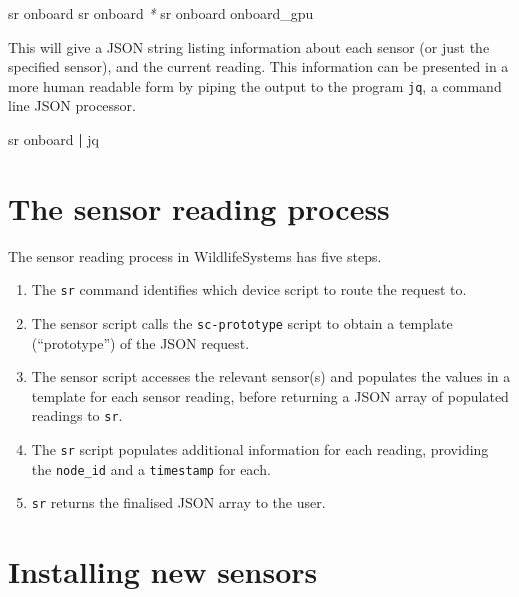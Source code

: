 \documentclass[
]{book}
\newenvironment{Shaded}{\begin{snugshade}}{\end{snugshade}}
\newcommand{\ExtensionTok}[1]{#1}
\newcommand{\KeywordTok}[1]{\textcolor[rgb]{0.13,0.29,0.53}{\textbf{#1}}}
\newcommand{\NormalTok}[1]{#1}
\newcommand{\PreprocessorTok}[1]{\textcolor[rgb]{0.56,0.35,0.01}{\textit{#1}}}
\begin{document}
\begin{Shaded}
\begin{Highlighting}[]
\ExtensionTok{sr}\NormalTok{ onboard}
\ExtensionTok{sr}\NormalTok{ onboard }\PreprocessorTok{*}
\ExtensionTok{sr}\NormalTok{ onboard onboard\_gpu}
\end{Highlighting}
\end{Shaded}

This will give a JSON string listing information about each sensor (or just the specified sensor), and the current reading. This information can be presented in a more human readable form by piping the output to the program \texttt{jq}, a command line JSON processor.

\begin{Shaded}
\begin{Highlighting}[]
\ExtensionTok{sr}\NormalTok{ onboard }\KeywordTok{|} \ExtensionTok{jq}
\end{Highlighting}
\end{Shaded}

\section{The sensor reading process}\label{the-sensor-reading-process}

The sensor reading process in WildlifeSystems has five steps.

\begin{enumerate}
\def\labelenumi{\arabic{enumi}.}
\item
  The \texttt{sr} command identifies which device script to route the request to.
\item
  The sensor script calls the \texttt{sc-prototype} script to obtain a template (``prototype'') of the JSON request.
\item
  The sensor script accesses the relevant sensor(s) and populates the values in a template for each sensor reading, before returning a JSON array of populated readings to \texttt{sr}.
\item
  The \texttt{sr} script populates additional information for each reading, providing the \texttt{node\_id} and a \texttt{timestamp} for each.
\item
  \texttt{sr} returns the finalised JSON array to the user.
\end{enumerate}

\section{Installing new sensors}\label{installing-new-sensors}
\end{document}
